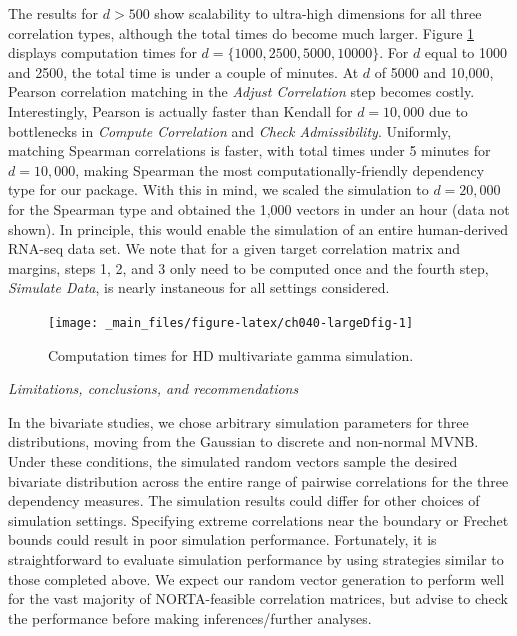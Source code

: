 \documentclass[
]{jss}
\begin{document}
The results for \(d > 500\) show scalability to ultra-high dimensions for all three correlation types, although the total times do become much larger.
Figure \ref{fig:ch040-largeDfig} displays computation times for \(d=\{1000, 2500, 5000, 10000\}\). For \(d\) equal to 1000 and 2500, the total time is under a couple of minutes. At \(d\) of 5000 and 10,000, Pearson correlation matching in the \emph{Adjust Correlation} step becomes costly. Interestingly, Pearson is actually faster than Kendall for \(d=10,000\) due to bottlenecks in \emph{Compute Correlation} and \emph{Check Admissibility}. Uniformly, matching Spearman correlations is faster, with total times under 5 minutes for \(d=10,000\), making Spearman the most computationally-friendly dependency type for our package. With this in mind, we scaled the simulation to \(d=20,000\) for the Spearman type and obtained the 1,000 vectors in under an hour (data not shown). In principle, this would enable the simulation of an entire human-derived RNA-seq data set. We note that for a given target correlation matrix and margins, steps 1, 2, and 3 only need to be computed once and the fourth step, \emph{Simulate Data}, is nearly instaneous for all settings considered.

\begin{CodeChunk}
\begin{figure}

{\centering \texttt{[image: \_main\_files/figure-latex/ch040-largeDfig-1]} 

}

\caption[Computation times for HD multivariate gamma simulation]{Computation times for HD multivariate gamma simulation.}\label{fig:ch040-largeDfig}
\end{figure}
\end{CodeChunk}

\emph{Limitations, conclusions, and recommendations}

In the bivariate studies, we chose arbitrary simulation parameters for three distributions, moving from the Gaussian to discrete and non-normal MVNB. Under these conditions, the simulated random vectors sample the desired bivariate distribution across the entire range of pairwise correlations for the three dependency measures. The simulation results could differ for other choices of simulation settings. Specifying extreme correlations near the boundary or Frechet bounds could result in poor simulation performance. Fortunately, it is straightforward to evaluate simulation performance by using strategies similar to those completed above. We expect our random vector generation to perform well for the vast majority of NORTA-feasible correlation matrices, but advise to check the performance before making inferences/further analyses.
\end{document}
